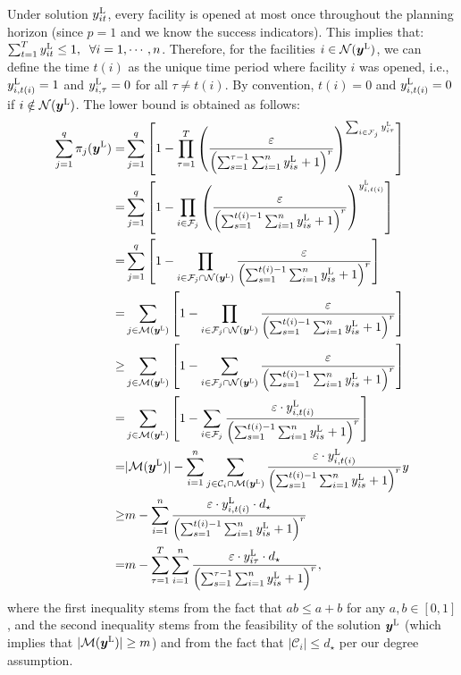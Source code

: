 \documentclass[nonblindrev]{informs3noheader}
\def\calC{\mathcal{C}}
\def\calF{\mathcal{F}}
\def\calM{\mathcal{M}}
\def\calN{\mathcal{N}}
\def\by{\boldsymbol{y}}
\begin{document}
Under solution $y^{\textsc{L}}_{it}$, every facility is opened at most once throughout the planning horizon (since $p=1$ and we know the success indicators). This implies that: $\sum_{t=1}^Ty^{\textsc{L}}_{it}\leq 1, \;\;\forall i=1,\cdots,n$. Therefore, for the facilities $i\in\calN(\by^{\textsc{L}})$, we can define the time $t(i)$ as the unique time period where facility $i$ was opened, i.e., $y^{\textsc{L}}_{i,t(i)}=1$ and $y^{\textsc{L}}_{i,\tau}=0$ for all $\tau\neq t(i)$. By convention, $t(i)=0$ and $y^{\textsc{L}}_{i,t(i)}=0$ if $i\notin\calN(\by^{\textsc{L}})$. The lower bound is obtained as follows:
\begin{align*}
    \sum_{j=1}^q\pi_{j}(\by^{\textsc{L}})
     =&\sum_{j=1}^q \left[1-\prod_{\tau=1}^T \left(\frac{\varepsilon}{\left(\sum_{s=1}^{\tau-1}\sum_{i=1}^n y^{\textsc{L}}_{is}+1\right)^r}\right)^{\sum_{i \in \calF_j} y^{\textsc{L}}_{i\tau}}\right]\\
     =&\sum_{j=1}^q \left[1-\prod_{i \in \calF_j} \left(\frac{\varepsilon}{\left(\sum_{s=1}^{t(i)-1}\sum_{i=1}^n y^{\textsc{L}}_{is}+1\right)^r}\right)^{y^{\textsc{L}}_{i,t(i)}}\right]\\
     =&\sum_{j=1}^q \left[1-\prod_{i \in \calF_j\cap\calN(\by^{\textsc{L}})} \frac{\varepsilon}{\left(\sum_{s=1}^{t(i)-1}\sum_{i=1}^n y^{\textsc{L}}_{is}+1\right)^r}\right]\\
     =&\sum_{j\in \calM(\by^{\textsc{L}})} \left[1-\prod_{i\in\calF_j\cap\calN(\by^{\textsc{L}})} \frac{\varepsilon}{\left(\sum_{s=1}^{t(i)-1}\sum_{i=1}^n y^{\textsc{L}}_{is}+1\right)^r}\right]\\
     \geq& \sum_{j\in \calM(\by^{\textsc{L}})} \left[1-\sum_{i\in\calF_j\cap\calN(\by^{\textsc{L}})} \frac{\varepsilon}{\left(\sum_{s=1}^{t(i)-1}\sum_{i=1}^n y^{\textsc{L}}_{is}+1\right)^r}\right]\\
     =&\sum_{j\in \calM(\by^{\textsc{L}})} \left[1-\sum_{i \in \calF_j} \frac{\varepsilon\cdot y^{\textsc{L}}_{i,t(i)}}{\left(\sum_{s=1}^{t(i)-1}\sum_{i=1}^n y^{\textsc{L}}_{is}+1\right)^r}\right]\\
     =&|\calM(\by^{\textsc{L}})|- \sum_{i=1}^n \sum_{j \in \calC_i\cap\calM(\by^{\textsc{L}})}  \frac{\varepsilon\cdot y^{\textsc{L}}_{i,t(i)}}{\left(\sum_{s=1}^{t(i)-1}\sum_{i=1}^n y^{\textsc{L}}_{is}+1\right)^r}y\\
     \geq& m-\sum_{i =1}^n \frac{\varepsilon\cdot y^{\textsc{L}}_{i,t(i)}\cdot d_\star}{\left(\sum_{s=1}^{t(i)-1}\sum_{i=1}^n y^{\textsc{L}}_{is}+1\right)^r}\\
     =& m-\sum_{\tau=1}^T \sum_{i =1}^n \frac{\varepsilon\cdot y^{\textsc{L}}_{i\tau}\cdot d_\star}{\left(\sum_{s=1}^{\tau-1}\sum_{i=1}^n y^{\textsc{L}}_{is}+1\right)^r},
\end{align*}
where the first inequality stems from the fact that $ab\leq a+b$ for any $a,b\in[0,1]$, and the second inequality stems from the feasibility of the solution $\by^{\textsc{L}}$ (which implies that $|\calM(\by^{\textsc{L}})|\geq m$) and from the fact that $|\calC_i|\leq d_\star$ per our degree assumption.
\end{document}
